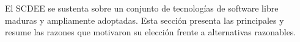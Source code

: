 El SCDEE se sustenta sobre un conjunto de tecnologías de software libre
maduras y ampliamente adoptadas. Esta sección presenta las principales y
resume las razones que motivaron su elección frente a alternativas
razonables.
